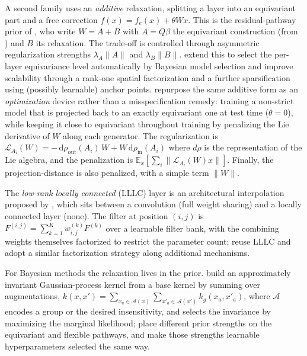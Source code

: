 \documentclass[mathematics,review,submit,moreauthors]{Definitions/mdpi}
\begin{document}
A second family uses an \emph{additive} relaxation, splitting a layer into an equivariant part and a free correction $f(x)=f_e(x)+\theta Wx$.
This is the residual-pathway prior of \citet{finzi2021anips}, who write $W=A+B$ with $A=Q\beta$ the equivariant construction (from \citep{finzi2021p3icml}) and $B$ its relaxation.
The trade-off is controlled through asymmetric regularization strengths $\lambda_A\|A\|$ and $\lambda_B\|B\|$.
\citet{ouderaa2023} extend this to select the per-layer equivariance level automatically by Bayesian model selection and improve scalability through a rank-one spatial factorization and a further sparsification using (possibly learnable) anchor points.
\citet{pertigkiozoglou2024} repurpose the same additive form as an \emph{optimization} device rather than a misspecification remedy: training a non-strict model that is projected back to an exactly equivariant one at test time ($\theta=0$), while keeping it close to equivariant throughout training by penalizing the Lie derivative of $W$ along each generator.
The regularization is $\mathcal{L}_{A_i}(W)=-\,\mathrm d\rho_{\mathrm{out}}(A_i)\,W+W\,\mathrm d\rho_{\mathrm{in}}(A_i)$ where $d\rho$ is the representation of the Lie algebra, and the penalization is $\mathbb{E}_x[\sum_i\|\mathcal{L}_{A_i}(W)x\|]$.
Finally, the projection-distance is also penalized, with a simple term $\|W\|$.
 
The \emph{low-rank locally connected} (LLLC) layer is an architectural interpolation proposed by \citet{elsayed2020p3icml}, which sits between a convolution (full weight sharing) and a locally connected layer (none).
The filter at position $(i,j)$ is $F^{(i,j)}=\sum_{k=1}^{K}w^{(k)}_{i,j}F^{(k)}$ over a learnable filter bank, with the combining weights themselves factorized to restrict the parameter count; \citet{zhou2021} reuse LLLC and \citet{ouderaa2023} adopt a similar factorization strategy along additional mechanisms. 

For Bayesian methods the relaxation lives in the prior. \citet{vanderwilk2018anips} build an approximately invariant Gaussian-process kernel from a base kernel by summing over augmentations, $k(x,x')=\sum_{x_a\in\mathcal{A}(x)}\sum_{x'_a\in\mathcal{A}(x')}k_g(x_a,x'_a)$, where $\mathcal{A}$ encodes a group or the desired insensitivity, and selects the invariance by maximizing the marginal likelihood; \citet{finzi2021anips} place different prior strengths on the equivariant and flexible pathways, and \citet{ouderaa2023} make those strengths learnable hyperparameters selected the same way.
\end{document}
